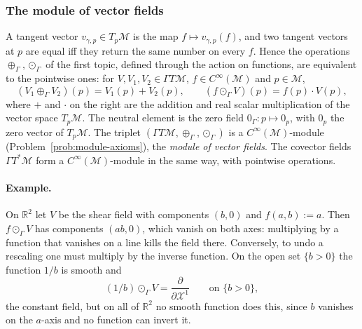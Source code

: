 \documentclass[11pt]{article}
\newcommand{\TpM}{T_p\mathcal M}
\newcommand{\Cinf}{C^\infty(\mathcal M)}
\begin{document}
\subsubsection*{The module of vector fields}
A tangent vector $v_{\gamma,p}\in\TpM$ is the map $f\mapsto v_{\gamma,p}(f)$, and two tangent vectors at $p$ are equal iff they return the same number on every $f$. Hence the operations $\oplus_\Gamma,\odot_\Gamma$ of the first topic, defined through the action on functions, are equivalent to the pointwise ones: for $V,V_1,V_2\in\Gamma T\mathcal M$, $f\in\Cinf$ and $p\in\mathcal M$,
\[
(V_1\oplus_\Gamma V_2)(p)=V_1(p)+V_2(p),\qquad (f\odot_\Gamma V)(p)=f(p)\cdot V(p),
\]
where $+$ and $\cdot$ on the right are the addition and real scalar multiplication of the vector space $\TpM$. The neutral element is the zero field $0_\Gamma:p\mapsto0_p$, with $0_p$ the zero vector of $\TpM$. The triplet $(\Gamma T\mathcal M,\oplus_\Gamma,\odot_\Gamma)$ is a $\Cinf$-module (Problem~\ref{prob:module-axioms}), the \emph{module of vector fields}. The covector fields $\Gamma T^*\mathcal M$ form a $\Cinf$-module in the same way, with pointwise operations.

\paragraph{Example.} On $\mathbb R^2$ let $V$ be the shear field with components $(b,0)$ and $f(a,b):=a$. Then $f\odot_\Gamma V$ has components $(ab,0)$, which vanish on both axes: multiplying by a function that vanishes on a line kills the field there. Conversely, to undo a rescaling one must multiply by the inverse function. On the open set $\{b>0\}$ the function $1/b$ is smooth and
\[
(1/b)\odot_\Gamma V=\frac{\partial}{\partial\mathcal X^1}\qquad\text{on }\{b>0\},
\]
the constant field, but on all of $\mathbb R^2$ no smooth function does this, since $b$ vanishes on the $a$-axis and no function can invert it.
\end{document}
